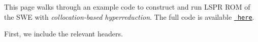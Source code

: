 

\begin{DoxyParagraph}{}
This page walks through an example code to construct and run LSPR ROM of the SWE with {\itshape collocation-\/based hyperreduction}. The full code is available \href{https://github.com/Pressio/pressio-tutorials/blob/swe2d_tutorial/tutorials/swe2d/online_phase/lspg_hyperReducedRom/main.cc}{\texttt{ here}}.
\end{DoxyParagraph}
First, we include the relevant headers. 
\begin{DoxyCode}{0}

\end{DoxyCode}



